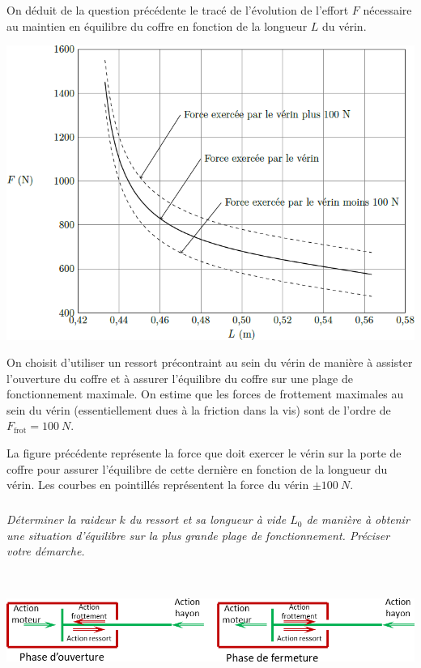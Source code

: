 \documentclass[10pt,fleqn]{article} %
\begin{document}
\begin{multicols}{2}
On déduit de la question précédente le tracé de l’évolution de l’effort $F$ nécessaire au maintien en équilibre du coffre en fonction de la longueur $L$ du vérin.


\begin{center}
\includegraphics[width=\linewidth]{images/fig_03}
\end{center}

On choisit d’utiliser un ressort précontraint au sein du vérin de manière à assister l’ouverture du coffre et à assurer l’équilibre du coffre sur une plage de fonctionnement maximale. On estime que les forces de frottement maximales au sein du vérin (essentiellement dues à la friction dans la vis) sont de l’ordre de $F_{\text{frot}}=\SI{100}{N}$. 

La figure précédente représente la force que doit exercer le vérin sur la porte de coffre pour assurer l’équilibre de cette dernière en fonction de la longueur du vérin. Les courbes en pointillés représentent la force du vérin $\pm\SI{100}{N}$.





\subparagraph{}
\textit{Déterminer la raideur $k$ du ressort et sa longueur à vide $L_0$ de manière à obtenir une situation d’équilibre
sur la plus grande plage de fonctionnement. Préciser votre démarche.}
\ifprof
\begin{corrige}~\\

\begin{center}
\includegraphics[width=\linewidth]{images/cor_04}
\end{center}


\end{corrige}
\end{multicols}
\end{document}
